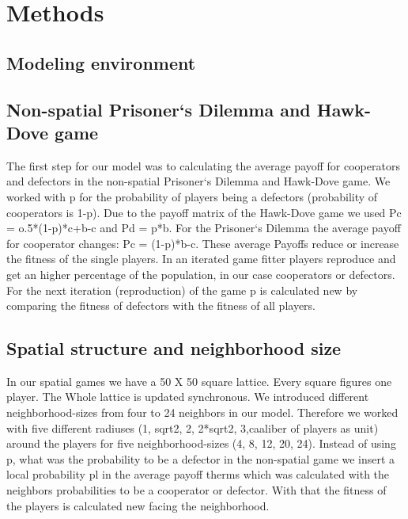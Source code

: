 \section{Methods}

\subsection{Modeling environment}

\subsection{Non-spatial Prisoner`s Dilemma and Hawk-Dove game}

The first step for our model was to calculating the average payoff for cooperators and defectors in the non-spatial Prisoner`s Dilemma and Hawk-Dove game. We worked with p for the probability of players being a  defectors (probability of cooperators is 1-p). Due to the payoff matrix of the Hawk-Dove game we used Pc = o.5*(1-p)*c+b-c and Pd = p*b. For the Prisoner`s Dilemma the average payoff for cooperator changes: Pc = (1-p)*b-c. These average Payoffs reduce or increase the fitness of the single players. In an iterated game fitter players reproduce and get an higher percentage of the population, in our case cooperators or defectors. For the next iteration (reproduction) of the game p is calculated new by comparing the fitness of defectors with the fitness of all players.

\subsection{Spatial structure and neighborhood size}
In our spatial games we have a 50 X 50 square lattice. Every square figures one player. The Whole lattice is updated synchronous. We introduced different neighborhood-sizes from four to 24 neighbors in our model. Therefore we worked with five different radiuses (1, sqrt2, 2, 2*sqrt2, 3,caaliber of players as unit) around the players for five neighborhood-sizes (4, 8, 12, 20, 24). Instead of using p, what was the probability to be a defector in the non-spatial game we insert a local probability pl in the average payoff therms which was calculated with the neighbors probabilities to be a cooperator or defector. With that the fitness of the players is calculated new facing the neighborhood.



